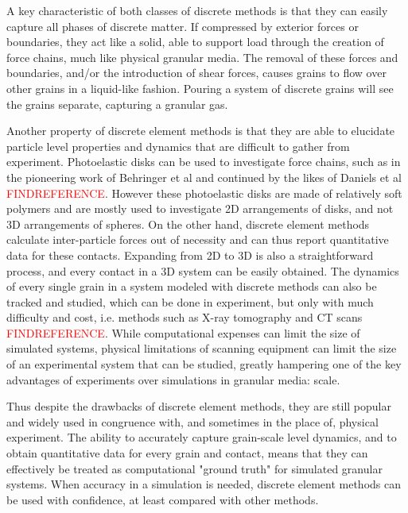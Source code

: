 A key characteristic of both classes of discrete methods is that they can easily capture all phases of discrete matter. If compressed by exterior forces or boundaries, they act like a solid, able to support load through the creation of force chains, much like physical granular media. The removal of these forces and boundaries, and/or the introduction of shear forces, causes grains to flow over other grains in a liquid-like fashion. Pouring a system of discrete grains will see the grains separate, capturing a granular gas.

Another property of discrete element methods is that they are able to elucidate particle level properties and dynamics that are difficult to gather from experiment. Photoelastic disks can be used to investigate force chains, such as in the pioneering work of Behringer et al and continued by the likes of Daniels et al \textcolor{red}{FINDREFERENCE}. However these photoelastic disks are made of relatively soft polymers and are mostly used to investigate 2D arrangements of disks, and not 3D arrangements of spheres. On the other hand, discrete element methods calculate inter-particle forces out of necessity and can thus report quantitative data for these contacts. Expanding from 2D to 3D is also a straightforward process, and every contact in a 3D system can be easily obtained. The dynamics of every single grain in a system modeled with discrete methods can also be tracked and studied, which can be done in experiment, but only with much difficulty and cost, i.e. methods such as X-ray tomography and CT scans \textcolor{red}{FINDREFERENCE}. While computational expenses can limit the size of simulated systems, physical limitations of scanning equipment can limit the size of an experimental system that can be studied, greatly hampering one of the key advantages of experiments over simulations in granular media: scale. 

Thus despite the drawbacks of discrete element methods, they are still popular and widely used in congruence with, and sometimes in the place of, physical experiment. The ability to accurately capture grain-scale level dynamics, and to obtain quantitative data for every grain and contact, means that they can effectively be treated as computational "ground truth" for simulated granular systems. When accuracy in a simulation is needed, discrete element methods can be used with confidence, at least compared with other methods.

